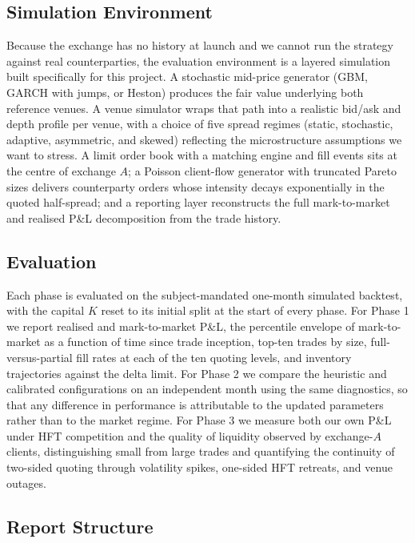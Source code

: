 \subsection{Simulation Environment}
\label{sec:intro-simulation}

Because the exchange has no history at launch and we cannot run the strategy
against real counterparties, the evaluation environment is a layered
simulation built specifically for this project. A stochastic mid-price
generator (GBM, GARCH with jumps, or Heston) produces the fair value
underlying both reference venues. A venue simulator wraps that path into a
realistic bid/ask and depth profile per venue, with a choice of five spread
regimes (static, stochastic, adaptive, asymmetric, and skewed)
reflecting the microstructure assumptions we want to stress. A
limit order book with a matching engine and fill events sits at the centre
of exchange $A$; a Poisson client-flow generator with
truncated Pareto sizes delivers counterparty orders whose intensity decays
exponentially in the quoted half-spread; and a reporting layer reconstructs
the full mark-to-market and realised P\&L decomposition from the trade
history.

\subsection{Evaluation}
\label{sec:intro-evaluation}

Each phase is evaluated on the subject-mandated one-month simulated
backtest, with the capital $K$ reset to its initial split at the start of
every phase. For Phase 1 we report realised and mark-to-market P\&L, the
percentile envelope of mark-to-market as a function of time since trade
inception, top-ten trades by size, full-versus-partial fill rates at each of
the ten quoting levels, and inventory trajectories against the delta limit.
For Phase 2 we compare the heuristic and calibrated configurations on an
independent month using the same diagnostics, so that any difference in
performance is attributable to the updated parameters rather than to the
market regime. For Phase 3 we measure both our own P\&L under HFT
competition and the quality of liquidity observed by exchange-$A$ clients,
distinguishing small from large trades and quantifying the continuity of
two-sided quoting through volatility spikes, one-sided HFT retreats, and
venue outages.

\subsection{Report Structure}
\label{sec:intro-structure}

